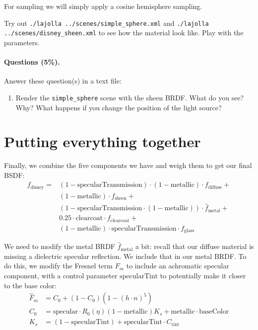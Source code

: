 For sampling we will simply apply a cosine hemisphere sampling.

Try out \lstinline{./lajolla ../scenes/simple_sphere.xml} and \lstinline{./lajolla ../scenes/disney_sheen.xml} to see how the material look like. Play with the parameters.

\paragraph{Questions (5\%).} Answer these question(s) in a text file:
\begin{enumerate}
	\item Render the \lstinline{simple_sphere} scene with the sheen BRDF. What do you see? Why? What happens if you change the position of the light source?
\end{enumerate}

\section{Putting everything together}
Finally, we combine the five components we have and weigh them to get our final BSDF:
\begin{equation}
\begin{aligned}
f_{\text{disney}} =& (1 - \text{specularTransmission}) \cdot (1 - \text{metallic}) \cdot f_{\text{diffuse}} + \\
                   & (1 - \text{metallic}) \cdot f_{\text{sheen}} + \\
                   & (1 - \text{specularTransmission} \cdot (1 - \text{metallic})) \cdot \hat{f}_{\text{metal}} + \\
                   & 0.25 \cdot \text{clearcoat} \cdot f_{\text{clearcoat}} + \\
                   & (1 - \text{metallic}) \cdot \text{specularTransmission} \cdot f_{\text{glass}}
\end{aligned}
\label{eq:disney_bsdf}
\end{equation}

We need to modify the metal BRDF $\hat{f}_{\text{metal}}$ a bit: recall that our diffuse material is missing
a dielectric specular reflection. We include that in our metal BRDF. To do this, we modify the Fresnel term $F_m$ to include an achromatic specular component, with a control parameter $\text{specularTint}$ to potentially make it closer to the base color:
\begin{equation}
\begin{aligned}
	\hat{F}_m &= C_0 + (1 - C_0) (1 - \left(h \cdot n\right)^5) \\
	C_0 &= \text{specular} \cdot R_0(\eta) (1 - \text{metallic}) K_s + \text{metallic} \cdot \text{baseColor} \\
	K_s &= (1 - \text{specularTint}) + \text{specularTint} \cdot C_{\text{tint}}
\end{aligned}
\end{equation}

